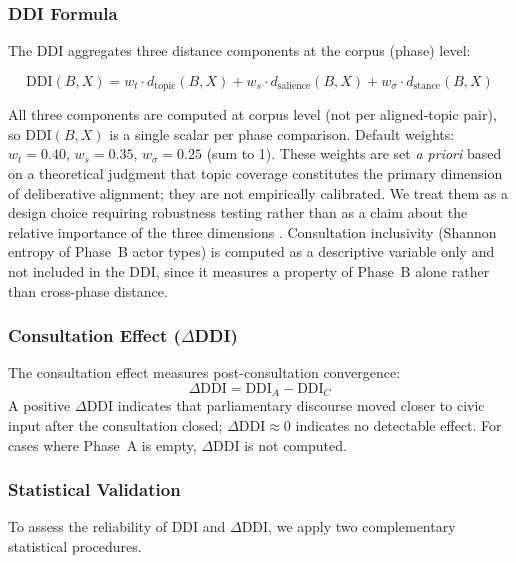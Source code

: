 \documentclass[sigconf,natbib]{acmart}
\begin{document}
\subsubsection{DDI Formula}

The DDI aggregates three distance components at the corpus (phase) level:

\begin{equation}
\text{DDI}(B, X) = w_t \cdot d_{\text{topic}}(B,X)
                 + w_s \cdot d_{\text{salience}}(B,X)
                 + w_\sigma \cdot d_{\text{stance}}(B,X)
\end{equation}

\noindent All three components are computed at corpus level (not per aligned-topic pair),
so $\text{DDI}(B, X)$ is a single scalar per phase comparison.
Default weights: $w_t=0.40$, $w_s=0.35$, $w_\sigma=0.25$ (sum to 1).
These weights are set \emph{a priori} based on a theoretical judgment that topic coverage
constitutes the primary dimension of deliberative alignment; they are not empirically
calibrated. We treat them as a design choice requiring robustness testing rather than as
a claim about the relative importance of the three dimensions \citep[cf.][]{OECD2008}.
Consultation inclusivity (Shannon entropy of Phase~B actor types) is computed as a
descriptive variable only and not included in the DDI, since it measures a property of
Phase~B alone rather than cross-phase distance.

\subsubsection{Consultation Effect ($\Delta$DDI)}
The consultation effect measures post-consultation convergence:
\begin{equation}
\Delta\text{DDI} = \text{DDI}_A - \text{DDI}_C
\end{equation}
A positive $\Delta\text{DDI}$ indicates that parliamentary discourse moved closer to civic
input after the consultation closed; $\Delta\text{DDI} \approx 0$ indicates no detectable
effect. For cases where Phase~A is empty, $\Delta\text{DDI}$ is not computed.

\subsubsection{Statistical Validation}
\label{sec:stats}

To assess the reliability of DDI and $\Delta$DDI, we apply two complementary
statistical procedures.
\end{document}
